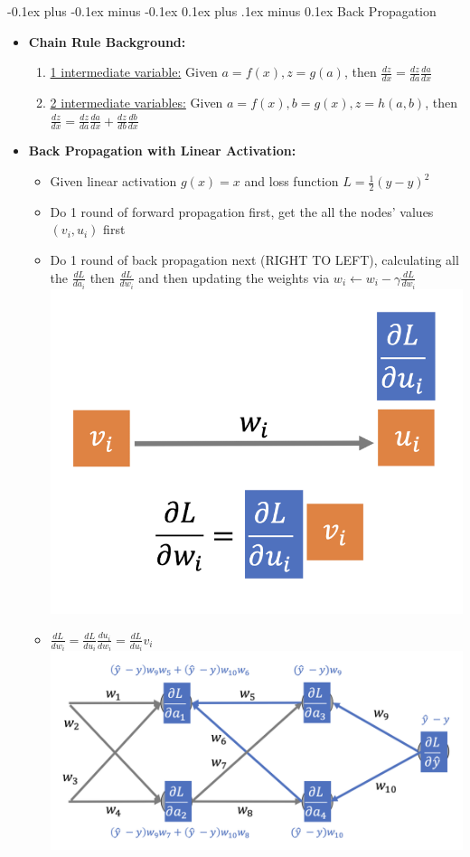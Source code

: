 \documentclass[landscape]{article}
\makeatletter
\renewcommand{\subsection}{\@startsection{subsection}{2}{0mm}%
  {-0.1ex plus -0.1ex minus -0.1ex}%
  {0.1ex plus .1ex minus 0.1ex}%
{\normalfont\scriptsize\bfseries}}
\makeatother
\begin{document}
\begin{multicols*}{5}
        \subsection{Back Propagation}
        \begin{itemize}
          \item \textbf{Chain Rule Background:}
          \begin{enumerate}
            \item \underline{1 intermediate variable:} Given $a=f(x), z=g(a)$, then $\frac{dz}{dx} = \frac{dz}{da}\frac{da}{dx}$
            \item \underline{2 intermediate variables:} Given $a=f(x), b=g(x), z=h(a,b)$, then $\frac{dz}{dx} = \frac{dz}{da}\frac{da}{dx} + \frac{dz}{db}\frac{db}{dx}$
          \end{enumerate}
          \item \textbf{Back Propagation with Linear Activation:}
          \begin{itemize}
            \item Given linear activation $g(x)=x$ and loss function $L=\frac{1}{2}(\hat{y} - y)^2$
            \item Do 1 round of forward propagation first, get the all the nodes' values $(v_i, u_i)$ first
            \item Do 1 round of back propagation next (RIGHT TO LEFT), calculating all the $\frac{dL}{da_i}$ then $\frac{dL}{dw_i}$ and then updating the weights via $w_i \leftarrow w_i - \gamma \frac{dL}{dw_i}$ \\
            \includegraphics[width=0.5\linewidth]{22_backprop_single_unit.png}
            \item $\frac{dL}{dw_i}=\frac{dL}{du_i}\frac{du_i}{dw_i}=\frac{dL}{du_i}v_i$
            \includegraphics[width=0.7\linewidth]{23_backprog_linear.png}

\end{itemize}
\end{itemize}
\end{multicols*}
\end{document}
